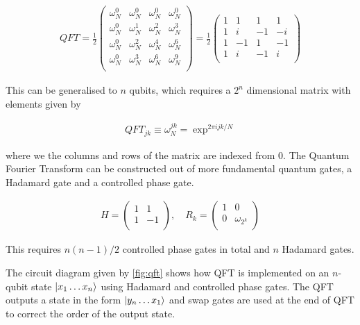 \begin{align}
    QFT = 
    \frac{1}{2}
    \begin{pmatrix}
        \omega_N^{0} & \omega_N^{0} & \omega_N^0 &\omega_N^0 \\
        \omega_N^0 & \omega_N^1 & \omega_N^2 & \omega_N^3 \\
        \omega_N^0 & \omega_N^2 & \omega_N^4 & \omega_N^6 \\
        \omega_N^0 & \omega_N^3 & \omega_N^6 & \omega_N^9 \\
    \end{pmatrix}
    =
    \frac{1}{2}
    \begin{pmatrix}
        1 & 1 & 1 & 1 \\
        1 & i & -1 & -i \\
        1 & -1 & 1 & -1 \\
        1 & i & -1 & i \\
    \end{pmatrix}
\end{align}

This can be generalised to $n$ qubits, which requires a $2^n$ dimensional matrix with elements given by 

\begin{align}
    QFT_{jk} \equiv \omega_N^{jk} = \exp^{2\pi ijk / N} 
\end{align}

where we the columns and rows of the matrix are indexed from 0. The Quantum Fourier Transform can be constructed out of more fundamental quantum gates, a Hadamard gate and a controlled phase gate. 

 \begin{align}
    H = 
    \begin{pmatrix}
    1 & 1 \\
    1 & -1 \\
    \end{pmatrix},
    \quad
    R_k = 
    \begin{pmatrix}
    1 & 0\\
    0 & \omega_{2^k}\\
    \end{pmatrix}
 \end{align}
 
 This requires $n(n-1)/2$ controlled phase gates in total and $n$ Hadamard gates. 

The circuit diagram given by \autoref{fig:qft} shows how QFT is implemented on an $n$-qubit state $\left\vert{x_1 \ldots x_n}\right\rangle$ using Hadamard and controlled phase gates. The QFT outputs a state in the form $\left\vert{y_n \ldots x_1}\right\rangle$ and swap gates are used at the end of QFT to correct the order of the output state.


